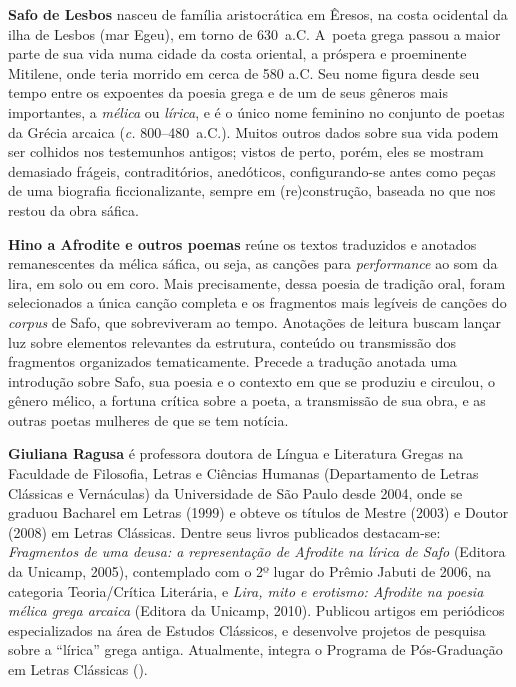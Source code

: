 \textbf{Safo de Lesbos} nasceu de família aristocrática em Êresos, na costa ocidental da ilha de Lesbos
(mar Egeu), em torno de 630~a.C. A~poeta grega passou a maior parte de
sua vida numa cidade da costa oriental, a próspera e proeminente Mitilene, onde
teria morrido em cerca de 580 a.C. Seu nome figura desde seu tempo entre os
expoentes da poesia grega e de um de seus gêneros mais importantes, a
\textit{mélica} ou \textit{lírica}, e é o único nome feminino no conjunto de
poetas da Grécia arcaica (\textit{c.} 800--480~a.C.). Muitos outros dados sobre
sua vida podem ser colhidos nos testemunhos antigos; vistos de perto, porém,
eles se mostram demasiado frágeis, contraditórios, anedóticos, configurando-se
antes como peças de uma biografia ficcionalizante, sempre em (re)construção,
baseada no que nos restou da obra sáfica.

\textbf{Hino a Afrodite e outros poemas} reúne os textos traduzidos e anotados 
remanescentes da mélica sáfica, ou seja, as canções para \textit{performance} 
ao som da lira, em solo ou em coro. Mais precisamente, dessa poesia de
tradição oral, foram selecionados a única canção completa e os fragmentos mais legíveis  
de canções do \textit{corpus} de Safo, que sobreviveram ao tempo. 
Anotações de leitura buscam lançar luz sobre elementos
relevantes da estrutura, conteúdo ou transmissão dos fragmentos organizados
tematicamente. Precede a tradução anotada uma introdução sobre Safo, sua poesia
e o contexto em que se produziu e circulou, o gênero mélico, a fortuna crítica
sobre a poeta, a transmissão de sua obra, e as outras poetas mulheres de que
se tem notícia. 

\textbf{Giuliana Ragusa} é professora doutora de Língua e Literatura Gregas na Faculdade
de Filosofia, Letras e Ciências Humanas (Departamento de Letras Clássicas e
Vernáculas) da Universidade de São Paulo desde 2004, onde se graduou Bacharel
em Letras (1999) e obteve os títulos de Mestre (2003) e Doutor (2008) em Letras
Clássicas. Dentre seus livros publicados destacam-se: 
\textit{Fragmentos de uma deusa: a representação de Afrodite
na lírica de Safo} (Editora da Unicamp, 2005), contemplado com o 2º lugar do 
Prêmio Jabuti de 2006, na categoria Teoria/Crítica Literária, e
\textit{Lira, mito e erotismo: Afrodite na poesia mélica grega arcaica} (Editora da Unicamp, 2010). 
Publicou artigos em periódicos especializados na
área de Estudos Clássicos, e desenvolve projetos de pesquisa sobre a “lírica”
grega antiga. Atualmente, integra o Programa de Pós-Graduação em Letras
Clássicas ().



